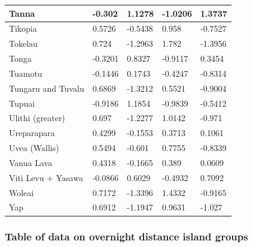 \documentclass[a4paper,10pt]{article} %
\begin{document}
\begin{landscape}
\begin{longtable}{| p{2.6cm} |  p{2cm} | p{2cm}  | p{2cm}  | p{2cm}|}
Tanna&-0.302&1.1278&-1.0206&1.3737\\ \hline
Tikopia&0.5726&-0.5438&0.958&-0.7527\\ \hline
Tokelau&0.724&-1.2963&1.782&-1.3956\\ \hline
Tonga&-0.3201&0.8327&-0.9117&0.3454\\ \hline
Tuamotu&-0.1446&0.1743&-0.4247&-0.8314\\ \hline
Tungaru and Tuvalu&0.6869&-1.3212&0.5521&-0.9004\\ \hline
Tupuai&-0.9186&1.1854&-0.9839&-0.5412\\ \hline
Ulithi (greater)&0.697&-1.2277&1.0142&-0.971\\ \hline
Ureparapara&0.4299&-0.1553&0.3713&0.1061\\ \hline
Uvea (Wallis)&0.5494&-0.601&0.7755&-0.8339\\ \hline
Vanua Lava&0.4318&-0.1665&0.389&0.0609\\ \hline
Viti Levu + Yasawa&-0.0866&0.6029&-0.4932&0.7092\\ \hline
Woleai&0.7172&-1.3396&1.4332&-0.9165\\ \hline
Yap&0.6912&-1.1947&0.9631&-1.027\\ \hline

 \end{longtable}
\end{landscape}
\newpage



\subsubsection{Table of data on overnight distance island groups}
\label{overnight_groups}
\end{document}

